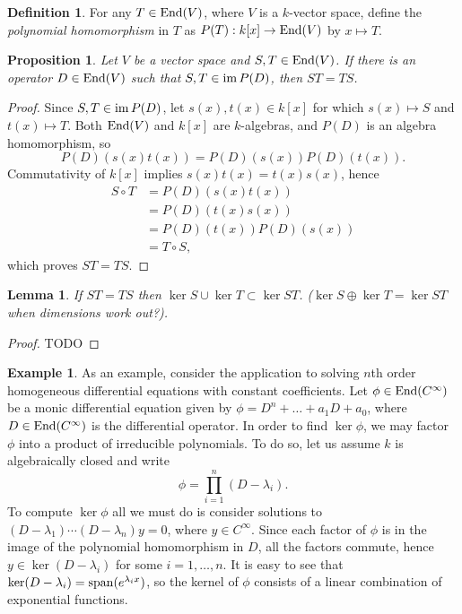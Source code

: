 \documentclass[12pt]{article}
\theoremstyle{definition}
\newtheorem{definition}{Definition}[section]
\newtheorem{example}{Example}[section]
\theoremstyle{plain}
\newtheorem{proposition}[theorem] {Proposition}
\newtheorem{lemma}[theorem]{Lemma}
\numberwithin{equation}{section}
\theoremstyle{definition}
\begin{document}
\begin{definition}
For any $  T \in \operatorname{End}(V) $, where $ V $ is a $ k $-vector space, define the \textit{polynomial homomorphism} in $ T $ as $ P(T): k[x] \to \operatorname{End}(V) $ by $ x \mapsto T $.
\end{definition}

\begin{proposition}
Let $ V $ be a vector space and $ S, T \in \operatorname{End} (V) $. If there is an operator $ D \in \operatorname{End}(V) $ such that $ S, T \in \operatorname{im} P(D) $, then $ ST = TS $.
\end{proposition}

\begin{proof}
Since $ S, T \in \operatorname{im} P(D) $, let $ s(x), t(x) \in k[x] $ for which $ s(x) \mapsto S $ and $ t(x) \mapsto T $. Both $ \operatorname{End}(V) $ and $ k[x] $ are $ k $-algebras, and $ P(D) $ is an algebra homomorphism, so 
\[P(D)(s(x) t(x)) = P(D)(s(x)) P(D)(t(x)).\]
Commutativity of $ k[x] $ implies $ s(x)t(x) = t(x)s(x) $, hence 
\begin{align*}
	S \circ T &= P(D)(s(x)t(x))\\
	&= P(D)(t(x)s(x))\\
	&= P(D)(t(x)) P(D)(s(x))\\
	&= T \circ S,
\end{align*}
which proves $ ST = TS $.
\end{proof}

\begin{lemma}
If $ST = TS$ then $\ker S \cup \ker T \subset \ker ST$. ($\ker S \oplus \ker T = \ker ST$ when dimensions work out?).
\end{lemma}

\begin{proof}
TODO
\end{proof}

\begin{example}
As an example, consider the application to solving $ n $th order homogeneous differential equations with constant coefficients. Let $ \phi \in \operatorname{End}(C^\infty)$ be a monic differential equation given by $ \phi = D^n + \ldots + a_1 D + a_0 $, where $ D \in \operatorname{End}(C^\infty) $ is the differential operator. In order to find $ \ker \phi $, we may factor $ \phi $ into a product of irreducible polynomials. To do so, let us assume $ k $ is algebraically closed and write 
\[\phi = \prod_{i=1}^n (D - \lambda_i).\]
To compute $ \ker \phi $ all we must do is consider solutions to $ (D - \lambda_1) \cdots (D - \lambda_n) y = 0 $, where $ y \in C^\infty $. Since each factor of $ \phi $ is in the image of the polynomial homomorphism in $ D $, all the factors commute, hence $ y \in \ker (D - \lambda_i) $ for some $ i = 1, \ldots, n $. It is easy to see that $ \ker (D - \lambda_i) = \operatorname{span}(e^{\lambda_i x})$, so the kernel of $ \phi $ consists of a linear combination of exponential functions.
\end{example}
\end{document}
